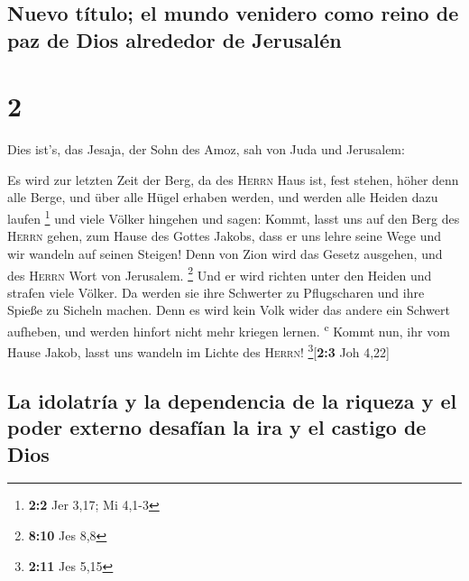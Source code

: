 \hypertarget{nuevo-tuxedtulo-el-mundo-venidero-como-reino-de-paz-de-dios-alrededor-de-jerusaluxe9n}{%
\subsection{Nuevo título; el mundo venidero como reino de paz de Dios
alrededor de
Jerusalén}\label{nuevo-tuxedtulo-el-mundo-venidero-como-reino-de-paz-de-dios-alrededor-de-jerusaluxe9n}}

\hypertarget{section-1}{%
\section{2}\label{section-1}}

 Dies ist's, das Jesaja, der Sohn des Amoz, sah von Juda
und Jerusalem:

 Es wird zur letzten Zeit der Berg, da des \textsc{Herrn}
Haus ist, fest stehen, höher denn alle Berge, und über alle Hügel
erhaben werden, und werden alle Heiden dazu laufen \footnote{\textbf{2:2}
  Jer 3,17; Mi 4,1-3}  und viele Völker hingehen und
sagen: Kommt, lasst uns auf den Berg des \textsc{Herrn} gehen, zum Hause
des Gottes Jakobs, dass er uns lehre seine Wege und wir wandeln auf
seinen Steigen! Denn von Zion wird das Gesetz ausgehen, und des
\textsc{Herrn} Wort von Jerusalem. \footnote{\textbf{8:10} Jes 8,8}
 Und er wird richten unter den Heiden und strafen viele
Völker. Da werden sie ihre Schwerter zu Pflugscharen und ihre Spieße zu
Sicheln machen. Denn es wird kein Volk wider das andere ein Schwert
aufheben, und werden hinfort nicht mehr kriegen lernen.
\textsuperscript{c}  Kommt nun, ihr vom Hause Jakob, lasst
uns wandeln im Lichte des \textsc{Herrn}! \footnote{\textbf{2:11} Jes
  5,15}{[}\textbf{2:3} Joh 4,22{]}

\hypertarget{la-idolatruxeda-y-la-dependencia-de-la-riqueza-y-el-poder-externo-desafuxedan-la-ira-y-el-castigo-de-dios}{%
\subsection{La idolatría y la dependencia de la riqueza y el poder
externo desafían la ira y el castigo de
Dios}\label{la-idolatruxeda-y-la-dependencia-de-la-riqueza-y-el-poder-externo-desafuxedan-la-ira-y-el-castigo-de-dios}}

